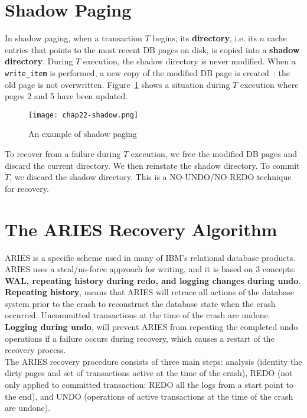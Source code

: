 \section{Shadow Paging}
In shadow paging, when a transaction $T$ begins, its \textbf{directory}, i.e. its $n$ cache entries that points to the most recent DB pages on disk, is copied into a \textbf{shadow directory}. During $T$ execution, the shadow directory is never modified. When a \texttt{write\_item} is performed, a new copy of the modified DB page is created~: the old page is not overwritten. Figure~\ref{fig:chap22-shadow} shows a situation during $T$ execution where pages 2 and 5 have been updated. \\

\begin{figure}[h!]
    \centering
    \texttt{[image: chap22-shadow.png]}
    \caption{An example of shadow paging}
    \label{fig:chap22-shadow}
\end{figure}

To recover from a failure during $T$ execution, we free the modified DB pages and discard the current directory. We then reinstate the shadow directory. To commit $T$, we discard the shadow directory. This is a NO-UNDO/NO-REDO technique for recovery. \\



\section{The ARIES Recovery Algorithm}
\label{chap22-aries}
ARIES is a specific scheme used in many of IBM’s relational database products. ARIES uses a steal/no-force approach for writing, and it is based on 3 concepts: \textbf{WAL, repeating history during redo, and logging changes during undo}.\\
\textbf{Repeating history}, means that ARIES will retrace all actions of the database system prior to the crash to reconstruct the database state when the crash occurred. Uncommitted transactions at the time of the crash are undone. \textbf{Logging during undo}, will prevent ARIES from repeating the completed undo operations if a failure occurs during recovery, which causes a restart of the recovery process.\\

The ARIES recovery procedure consists of three main steps: analysis (identity the dirty pages and set of transactions active at the time of the crash), REDO (not only applied to committed transaction: REDO all the logs from a start point to the end), and UNDO (operations of active transactions at the time of the crash are undone).\\

